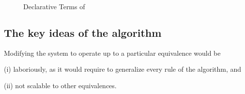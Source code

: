 \begin{figure}[h]
  \begin{multicols}{2}
    \ottgrammartabular{
      \ottc\ottinterrule
    }

    \ottgrammartabular{
      \ottv\ottinterrule
    }
  \end{multicols}
  \caption{Declarative Terms of \fexists}
  \label{fig:declarative-terms}
\end{figure}

\subsection{The key ideas of the algorithm}

Modifying the system to operate up to a particular equivalence would be
\begin{enumerate*}
  \item [(i)] laboriously, as it would require to generalize every rule of the algorithm, and
  \item [(ii)] not scalable to other equivalences. 
\end{enumerate*}
